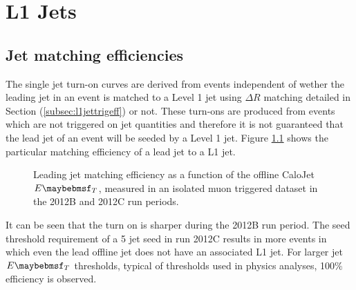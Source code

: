 \chapter{L1 Jets}

\section{Jet matching efficiencies}
\label{app:jetmatching}

The single jet turn-on curves are derived from events independent of wether the leading jet in an event is matched to a Level 1 jet using $\Delta R$ matching detailed in Section  (\ref{subsec:l1jettrigeff}) or not.  These turn-ons are produced from events which are not triggered on jet quantities and therefore it is not guaranteed that the lead jet of an event will be seeded by a Level 1 jet. Figure \ref{fig:leadjetmatcheff} shows the particular matching efficiency of a lead jet to a L1 jet.

\begin{figure}[htp]
\centering
{}
\caption[Leading jet matching efficiency as a function of the offline CaloJet $\et$.]{Leading jet matching efficiency as a function of the offline CaloJet $\et$, measured in an isolated muon triggered dataset in the 2012B and 2012C run periods.}
  \label{fig:leadjetmatcheff}
\end{figure}

It can be seen that the turn on is sharper during the 2012B run
period. The seed threshold requirement of a 5 \GeV jet seed in run 2012C results
in more events in which even the lead offline jet does not have an associated L1 jet. For larger jet $\et$
thresholds, typical of thresholds used in physics analyses, 100$\%$ efficiency is observed.

